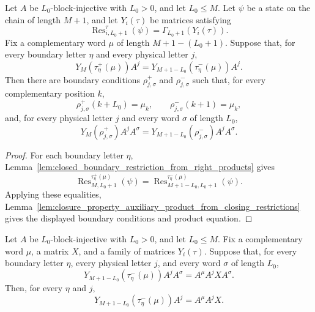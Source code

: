 \begin{lemma}
    \label{lem:closure_property_auxiliary_product_from_right_products}
    \leanok
    Let $A$ be $L_0$-block-injective with $L_0>0$, and let $L_0\le M$.
    Let $\psi$ be a state on the chain of length $M+1$, and let
    $Y_i(\tau)$ be matrices satisfying
    \[
        \operatorname{Res}^{\tau}_{i,L_0+1}(\psi)
        =
        \Gamma_{L_0+1}(Y_i(\tau)).
    \]
    Fix a complementary word $\mu$ of length $M+1-(L_0+1)$.
    Suppose that, for every boundary letter $\eta$ and every physical letter
    $j$,
    \[
        Y_M(\tau^+_{\eta}(\mu))A^j
        =
        Y_{M+1-L_0}(\tau^-_{\eta}(\mu))A^j .
    \]
    Then there are boundary conditions $\rho^+_{j,\sigma}$ and
    $\rho^-_{j,\sigma}$ such that, for every complementary position $k$,
    \[
        \rho^+_{j,\sigma}(k+L_0)=\mu_k,
        \qquad
        \rho^-_{j,\sigma}(k+1)=\mu_k,
    \]
    and, for every physical letter $j$ and every word $\sigma$ of length
    $L_0$,
    \[
        Y_M(\rho^+_{j,\sigma})A^jA^\sigma
        =
        Y_{M+1-L_0}(\rho^-_{j,\sigma})A^jA^\sigma.
    \]
\end{lemma}

\begin{proof}
    \leanok
    For each boundary letter $\eta$,
    Lemma~\ref{lem:closed_boundary_restriction_from_right_products} gives
    \[
        \operatorname{Res}^{\tau^+_\eta(\mu)}_{M,L_0+1}(\psi)
        =
        \operatorname{Res}^{\tau^-_\eta(\mu)}_{M+1-L_0,L_0+1}(\psi).
    \]
    Applying these equalities,
    Lemma~\ref{lem:closure_property_auxiliary_product_from_closing_restrictions}
    gives the displayed boundary conditions and product equation.
\end{proof}

\begin{lemma}
    \label{lem:closure_property_opposite_boundary_comparison_from_right_words}
    \leanok
    Let $A$ be $L_0$-block-injective with $L_0>0$, and let $L_0\le M$.
    Fix a complementary word $\mu$, a matrix $X$, and a family of matrices
    $Y_i(\tau)$. Suppose that, for every boundary letter $\eta$, every
    physical letter $j$, and every word $\sigma$ of length $L_0$,
    \[
        Y_{M+1-L_0}(\tau^-_\eta(\mu))A^jA^\sigma
        =
        A^\mu A^jXA^\sigma .
    \]
    Then, for every $\eta$ and $j$,
    \[
        Y_{M+1-L_0}(\tau^-_\eta(\mu))A^j
        =
        A^\mu A^jX .
    \]
\end{lemma}

